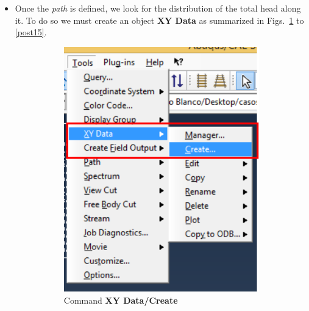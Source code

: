 \begin{itemize}
\item Once the \textit{path} is defined, we look for the distribution
  of the total head along it. To do so we must create an object
  \textbf {XY Data} as summarized in Figs.~\ref{post11} to
  \ref{post15}.
  \begin{figure}[!h]
    \centering
    \begin{subfigure}[!h]{0.21\textwidth}
      \includegraphics[width=\textwidth]{./body/images/post11.pdf}
      \caption{Command \textbf{XY Data/Create}}
      \label{post11}
    \end{subfigure}%
    \begin{subfigure}[!h]{0.35\textwidth}

\end{subfigure}
\end{figure}
\end{itemize}
